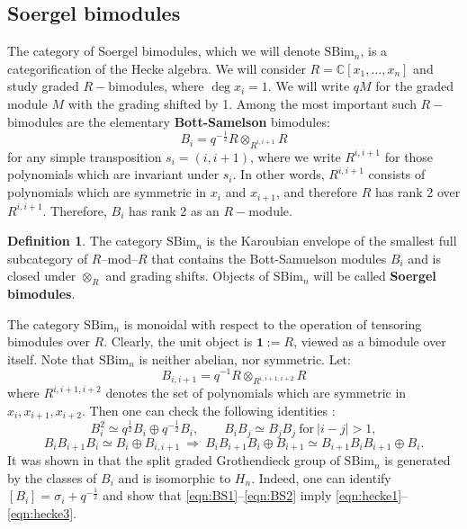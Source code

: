 \documentclass[12pt]{amsart}
\numberwithin{equation}{section}
\theoremstyle{definition}
\newtheorem{definition}[theorem]{Definition}
\theoremstyle{remark}
\newcommand{\CC}{\mathbb{C}}
\renewcommand{\1}{\mathbf{1}}
\newcommand{\SBim}{\mathrm{SBim}}
\begin{document}
\subsection{Soergel bimodules}
\label{sub:soergel}

The category of Soergel bimodules, which we will denote $\SBim_n$, is a categorification of the Hecke algebra. We will consider $R = \CC[x_1,...,x_n]$ and study graded $R-$bimodules, where $\deg x_i = 1$. We will write $q M$ for the graded module $M$ with the grading shifted by 1. Among the most important such $R-$bimodules are the elementary \textbf{Bott-Samelson} bimodules:
\begin{equation}
\label{eqn:bs}
B_i = q^{-\frac 12} R \otimes_{R^{i,i+1}} R
\end{equation}
for any simple transposition $s_i = (i,i+1)$, where we write $R^{i,i+1}$ for those polynomials which are invariant under $s_i$.  In other words, $R^{i,i+1}$ consists of polynomials which are symmetric in $x_i$ and $x_{i+1}$, and therefore $R$ has rank 2 over $R^{i,i+1}$. Therefore, $B_i$ has rank 2 as an $R-$module. 

\begin{definition}
\label{def:soergel}
The category $\SBim_n$ is the Karoubian envelope of the smallest full subcategory of $R\text{--mod--}R$ that contains the Bott-Samuelson modules $B_i$ and is closed under $\otimes_R$ and grading shifts. Objects of $\SBim_n$ will be called \textbf{Soergel bimodules}.
\end{definition}

The category $\SBim_n$ is monoidal with respect to the operation of tensoring bimodules over $R$. Clearly, the unit object is $\1 := R$, viewed as a bimodule over itself. Note that $\SBim_n$ is neither abelian, nor symmetric. Let:
$$
B_{i,i+1} = q^{-1} R \otimes_{R^{i,i+1,i+2}} R
$$
where  $R^{i,i+1,i+2}$ denotes the set of polynomials which are symmetric in $x_i,x_{i+1},x_{i+2}$. Then one can check the following identities \cite{Kh,Soergel}:
\begin{equation}
\label{eqn:BS1}
B_i^2\simeq q^{\frac 12} B_i\oplus q^{-\frac 12} B_i, \qquad B_iB_j\simeq B_jB_j\ \text{for}\ |i-j|>1,
\end{equation}
\begin{equation}
\label{eqn:BS2}
B_iB_{i+1}B_{i}\simeq B_i\oplus B_{i,i+1}\ \Rightarrow\ B_iB_{i+1}B_{i}\oplus B_{i+1}\simeq B_{i+1}B_{i}B_{i+1}\oplus B_{i}.
\end{equation}
It was shown in \cite{Soergel} that the split graded Grothendieck group of $\SBim_n$ is generated by the classes of $B_i$ and is isomorphic to $H_n$. Indeed, one can identify $[B_i]=\sigma_i+q^{-\frac 12}$ and show that \eqref{eqn:BS1}--\eqref{eqn:BS2} imply \eqref{eqn:hecke1}--\eqref{eqn:hecke3}.
\end{document}
